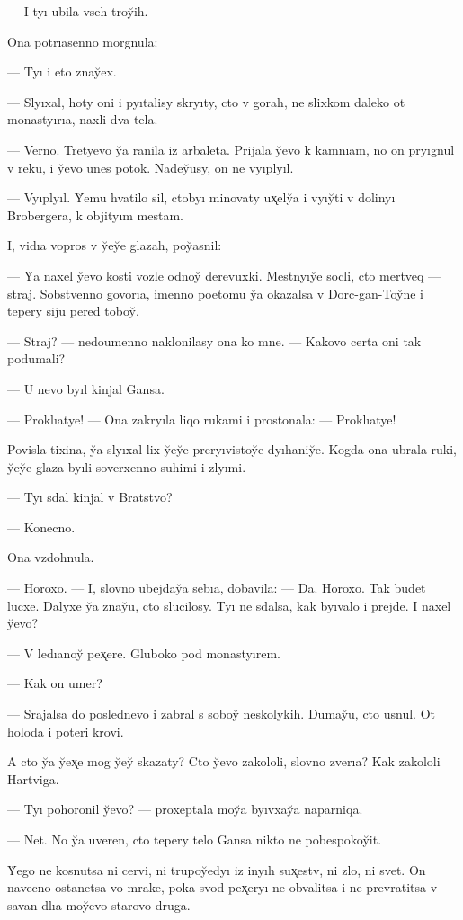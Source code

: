 \documentclass[10pt]{book}
\begin{document}
— I tyı ubila vseh troy̆ih.

Ona potrıasenno morgnula:

— Tyı i eto znay̆ex.

— Slyıxal, hoty oni i pyıtalisy skryıty, cto v gorah, ne slixkom daleko ot monastyırıa, naxli dva tela.

— Verno. Tretyevo y̆a ranila iz arbaleta. Prijala y̆evo k kamnıam, no on pryıgnul v reku, i y̆evo unes potok. Nadey̆usy, on ne vyıplyıl.

— Vyıplyıl. Y̆emu hvatilo sil, ctobyı minovaty ux̨ely̆a i vyıy̆ti v dolinyı Brobergera, k objityım mestam.

I, vidıa vopros v y̆ey̆e glazah, poy̆asnil:

— Y̆a naxel y̆evo kosti vozle odnoy̆ derevuxki. Mestnyıy̆e socli, cto mertveq — straj. Sobstvenno govorıa, imenno poetomu y̆a okazalsa v Dorc-gan-Toy̆ne i tepery siju pered toboy̆.

— Straj? — nedoumenno naklonilasy ona ko mne. — Kakovo certa oni tak podumali?

— U nevo byıl kinjal Gansa.

— Proklıatye! — Ona zakryıla liqo rukami i prostonala: — Proklıatye!

Povisla tixina, y̆a slyıxal lix y̆ey̆e preryıvistoy̆e dyıhaniy̆e. Kogda ona ubrala ruki, y̆ey̆e glaza byıli soverxenno suhimi i zlyımi.

— Tyı sdal kinjal v Bratstvo?

— Konecno.

Ona vzdohnula.

— Horoxo. — I, slovno ubejday̆a sebıa, dobavila: — Da. Horoxo. Tak budet lucxe. Dalyxe y̆a znay̆u, cto slucilosy. Tyı ne sdalsa, kak byıvalo i prejde. I naxel y̆evo?

— V ledıanoy̆ pex̨ere. Gluboko pod monastyırem.

— Kak on umer?

— Srajalsa do poslednevo i zabral s soboy̆ neskolykih. Dumay̆u, cto usnul. Ot holoda i poteri krovi.

A cto y̆a y̆ex̨e mog y̆ey̆ skazaty? Cto y̆evo zakololi, slovno zverıa? Kak zakololi Hartviga.

— Tyı pohoronil y̆evo? — proxeptala moy̆a byıvxay̆a naparniqa.

— Net. No y̆a uveren, cto tepery telo Gansa nikto ne pobespokoy̆it.

Y̆ego ne kosnutsa ni cervi, ni trupoy̆edyı iz inyıh sux̨estv, ni zlo, ni svet. On navecno ostanetsa vo mrake, poka svod pex̨eryı ne obvalitsa i ne prevratitsa v savan dlıa moy̆evo starovo druga.
\end{document}
